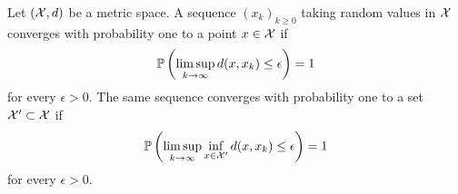 \begin{definition}
Let $(\mathcal{X}, d)$ be a metric space.
A sequence $(x_k)_{k \geq 0}$ taking random values in $\mathcal{X}$ converges with probability one to a point $x \in \mathcal{X}$ if
\begin{align*}
    \operatorname*{\mathbb{P}} \left( \limsup_{k \to \infty} d( x, x_k) \leq \epsilon \right)
    = 1
\end{align*}
for every $\epsilon>0$.
The same sequence converges with probability one to a set $\mathcal{X}' \subset \mathcal{X}$ if
\begin{align*}
    \operatorname*{\mathbb{P}} \left( \limsup_{k \to \infty} \inf_{x \in \mathcal{X}'} d( x, x_k) \leq \epsilon \right)
    = 1
\end{align*}
for every $\epsilon>0$.
\end{definition}